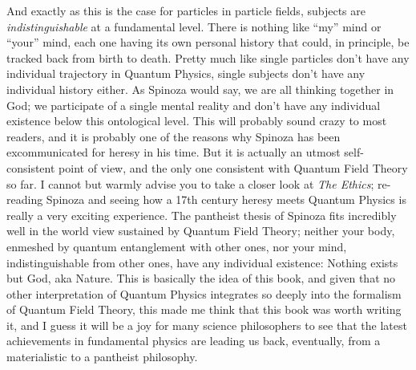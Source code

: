 And exactly as this is the case for particles in particle fields, subjects are \textit{indistinguishable} at a fundamental level.
There is nothing like ``my'' mind or ``your'' mind, each one having its own personal history that could, in principle, be tracked back from birth to death.
Pretty much like single particles don't have any individual trajectory in Quantum Physics, single subjects don't have any individual history either.
As Spinoza would say, we are all thinking together in God; we participate of a single mental reality and don't have any individual existence below this ontological level.
This will probably sound crazy to most readers, and it is probably one of the reasons why Spinoza has been excommunicated for heresy in his time.
But it is actually an utmost self-consistent point of view, and the only one consistent with Quantum Field Theory so far.
I cannot but warmly advise you to take a closer look at \textit{The Ethics}; re-reading Spinoza and seeing how a 17th century heresy meets Quantum Physics is really a very exciting experience.
The pantheist thesis of Spinoza fits incredibly well in the world view sustained by Quantum Field Theory; neither your body, enmeshed by quantum entanglement with other ones, nor your mind, indistinguishable from other ones, have any individual existence: Nothing exists but God, aka Nature.
This is basically the idea of this book, and given that no other interpretation of Quantum Physics integrates so deeply into the formalism of Quantum Field Theory, this made me think that this book was worth writing it, and I guess it will be a joy for many science philosophers to see that the latest achievements in fundamental physics are leading us back, eventually, from a materialistic to a pantheist philosophy.

